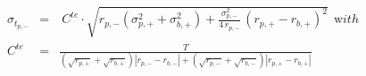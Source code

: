 


\begin{eqnarray*}
  \sigma_{t_{p,-}} & = & \ C^{te} \cdot \sqrt{r_{p,-}\left( \sigma_{p,+}^2 +
\sigma_{b,+}^2
          \right)  + \frac{\sigma_{p,-}^2} {4\,r_{p,-}}\,
          {\left( r_{p,+} - r_{b,+}\right) }^2} \ \ {\mathrm with}
\\
   C^{te} & = & \frac{T}
                 {\left( \sqrt{r_{p,+}} + \sqrt{r_{b,+}} \right)
                  \left| r_{p,-} - r_{b,-} \right| + 
                  \left( \sqrt{r_{p,-}} + \sqrt{r_{b,-}} \right)
                  \left| r_{p,+} - r_{b,+} \right|}
\end{eqnarray*}

